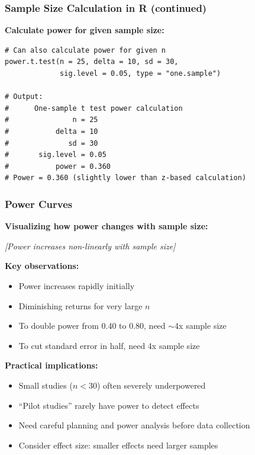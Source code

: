 \documentclass{beamer}
\begin{document}
\begin{frame}[fragile]
\frametitle{Sample Size Calculation in R (continued)}
\textbf{Calculate power for given sample size:}

\vspace{0.2cm}
\footnotesize
\begin{verbatim}
# Can also calculate power for given n
power.t.test(n = 25, delta = 10, sd = 30,
             sig.level = 0.05, type = "one.sample")

# Output:
#      One-sample t test power calculation
#               n = 25
#           delta = 10
#              sd = 30
#       sig.level = 0.05
#           power = 0.360
# Power = 0.360 (slightly lower than z-based calculation)
\end{verbatim}
\end{frame}

\begin{frame}
\frametitle{Power Curves}
\textbf{Visualizing how power changes with sample size:}

\vspace{0.3cm}
\begin{center}
\textit{[Power increases non-linearly with sample size]}
\end{center}

\vspace{0.3cm}
\textbf{Key observations:}
\begin{itemize}
\item Power increases rapidly initially
\item Diminishing returns for very large $n$
\item To double power from 0.40 to 0.80, need $\sim$4x sample size
\item To cut standard error in half, need 4x sample size
\end{itemize}

\vspace{0.5cm}
\textbf{Practical implications:}
\begin{itemize}
\item Small studies ($n < 30$) often severely underpowered
\item ``Pilot studies'' rarely have power to detect effects
\item Need careful planning and power analysis before data collection
\item Consider effect size: smaller effects need larger samples
\end{itemize}
\end{frame}
\end{document}
